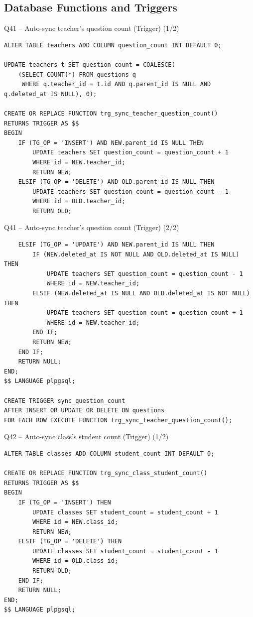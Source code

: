 \documentclass[aspectratio=169, 10pt]{beamer}
\begin{document}
\subsection{Database Functions and Triggers}

\begin{frame}[fragile]{Q41 -- Auto-sync teacher's question count (Trigger) (1/2)}
\begin{lstlisting}
ALTER TABLE teachers ADD COLUMN question_count INT DEFAULT 0;

UPDATE teachers t SET question_count = COALESCE(
    (SELECT COUNT(*) FROM questions q 
     WHERE q.teacher_id = t.id AND q.parent_id IS NULL AND q.deleted_at IS NULL), 0);

CREATE OR REPLACE FUNCTION trg_sync_teacher_question_count()
RETURNS TRIGGER AS $$
BEGIN
    IF (TG_OP = 'INSERT') AND NEW.parent_id IS NULL THEN
        UPDATE teachers SET question_count = question_count + 1 
        WHERE id = NEW.teacher_id;
        RETURN NEW;
    ELSIF (TG_OP = 'DELETE') AND OLD.parent_id IS NULL THEN
        UPDATE teachers SET question_count = question_count - 1 
        WHERE id = OLD.teacher_id;
        RETURN OLD;
\end{lstlisting}
\end{frame}


\begin{frame}[fragile]{Q41 -- Auto-sync teacher's question count (Trigger) (2/2)}
    \begin{lstlisting}
    ELSIF (TG_OP = 'UPDATE') AND NEW.parent_id IS NULL THEN
        IF (NEW.deleted_at IS NOT NULL AND OLD.deleted_at IS NULL) THEN
            UPDATE teachers SET question_count = question_count - 1 
            WHERE id = NEW.teacher_id;
        ELSIF (NEW.deleted_at IS NULL AND OLD.deleted_at IS NOT NULL) THEN
            UPDATE teachers SET question_count = question_count + 1 
            WHERE id = NEW.teacher_id;
        END IF;
        RETURN NEW;
    END IF;
    RETURN NULL;
END;
$$ LANGUAGE plpgsql;

CREATE TRIGGER sync_question_count
AFTER INSERT OR UPDATE OR DELETE ON questions
FOR EACH ROW EXECUTE FUNCTION trg_sync_teacher_question_count();
    \end{lstlisting}
\end{frame}


\begin{frame}[fragile]{Q42 -- Auto-sync class's student count (Trigger) (1/2)}
\begin{lstlisting}
ALTER TABLE classes ADD COLUMN student_count INT DEFAULT 0;

CREATE OR REPLACE FUNCTION trg_sync_class_student_count()
RETURNS TRIGGER AS $$
BEGIN
    IF (TG_OP = 'INSERT') THEN
        UPDATE classes SET student_count = student_count + 1 
        WHERE id = NEW.class_id;
        RETURN NEW;
    ELSIF (TG_OP = 'DELETE') THEN
        UPDATE classes SET student_count = student_count - 1 
        WHERE id = OLD.class_id;
        RETURN OLD;
    END IF;
    RETURN NULL;
END;
$$ LANGUAGE plpgsql;
\end{lstlisting}
\end{frame}
\end{document}
